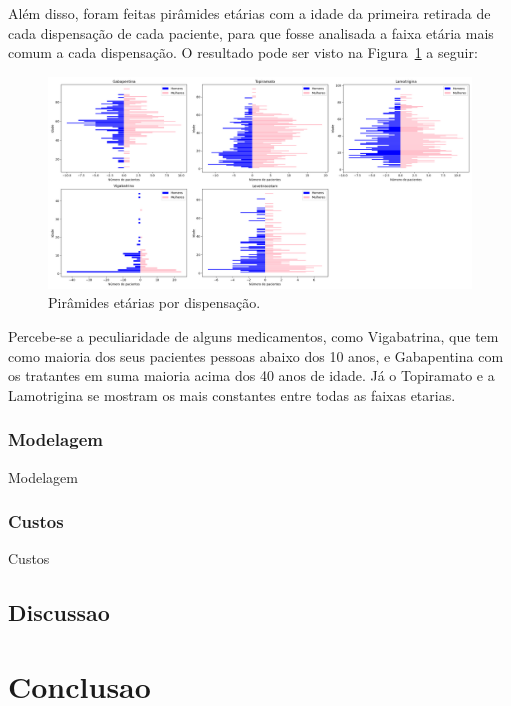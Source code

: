 \documentclass[article,a4paper,12pt,brazil,sumario=tradicional]{abntex2}
\begin{document}
Além disso, foram feitas pirâmides etárias com a idade da primeira retirada de cada dispensação de cada paciente, para que fosse analisada a faixa etária mais comum a cada dispensação. O resultado pode ser visto na Figura~\ref{fig:grid_piramides_etarias_medicamento} a seguir:

\begin{figure}[!ht]
    \centering
    \includegraphics[width=1\textwidth]{grid_piramides_etarias_medicamento.png}
    \caption{Pirâmides etárias por dispensação.}
    \label{fig:grid_piramides_etarias_medicamento}
\end{figure}

Percebe-se a peculiaridade de alguns medicamentos, como Vigabatrina, que tem como maioria dos seus pacientes pessoas abaixo dos 10 anos, e Gabapentina com os tratantes em suma maioria acima dos 40 anos de idade. Já o Topiramato e a Lamotrigina se mostram os mais constantes entre todas as faixas etarias.

\subsubsection{Modelagem}


Modelagem

\subsubsection{Custos}

Custos

\subsection{Discussao}

\section{Conclusao}
\end{document}
